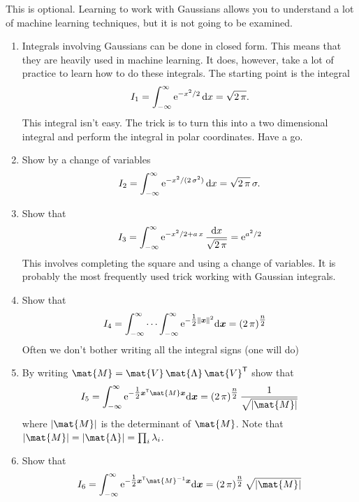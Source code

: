 \documentclass[11pt]{article}
\newcommand{\tr}{\textsf{T}}
\newcommand{\e}[1]{{\rm e}^{#1}}
\newcommand{\dd}{\mathrm{d}}
\begin{document}
This is optional.  Learning to work with Gaussians allows you to
understand a lot of machine learning techniques, but it is not
going to be examined.

\begin{enumerate}
\item Integrals involving Gaussians can be done in closed form.  This
means that they are heavily used in machine learning.  It does,
however, take a lot of practice to learn how to do these
integrals.  The starting point is the integral
\begin{align*}
 I_1 = \int_{-\infty}^{\infty} \e{-x^2/2} \, \dd x = \sqrt{2\,\pi}.
\end{align*}
This integral isn't easy.  The trick is to turn this into a two
dimensional integral and perform the integral in polar
coordinates. Have a go.
\item Show by a change of variables
\begin{align*}
I_2 = \int_{-\infty}^{\infty} \e{-x^2/(2\,\sigma^{2})} \, \dd x = \sqrt{2\,\pi}\,\sigma.
\end{align*}
\item Show that
\begin{align*}
I_3 = \int_{-\infty}^{\infty} \e{-x^2/2 + a \,x} \, \frac{\dd x}{\sqrt{2\,\pi}}
= \e{a^2/2}
\end{align*}
This involves completing the square and using a change of
variables.  It is probably the most frequently used trick
working with Gaussian integrals.
\item Show that
\begin{align*}
I_4 &= \int_{-\infty}^{\infty} \cdots \int_{-\infty}^{\infty}
 \e{-\tfrac{1}{2} \|\bm{x}\|^2} 
\dd \bm{x} = (2\,\pi)^{\tfrac{n}{2}}
\end{align*}
Often we don't bother writing all the integral signs (one will do)
\item By writing \(\mat{M} =
      \mat{V}\,\mat{\Lambda}\,\mat{V}^{\tr}\) show that
\begin{align*}
I_5 = \int_{-\infty}^{\infty}  \e{-\tfrac{1}{2} \bm{x}^{\tr} \mat{M} \bm{x}}  \dd \bm{x} = 
(2\,\pi)^{\tfrac{n}{2}} \, \frac{1}{\sqrt{|\mat{M}|}}
\end{align*}
where \(|\mat{M}|\) is the determinant of \(\mat{M}\).  Note that
\(|\mat{M}|=|\mat{\Lambda}| = \prod_i \lambda_{i}\).
\item Show that
\begin{align*}
I_6 = \int_{-\infty}^{\infty}  \e{-\tfrac{1}{2} \bm{x}^{\tr} \mat{M}^{-1} \bm{x}}  \dd \bm{x} = 
(2\,\pi)^{\tfrac{n}{2}} \, \sqrt{|\mat{M}|}
\end{align*}
\end{enumerate}
\end{document}
